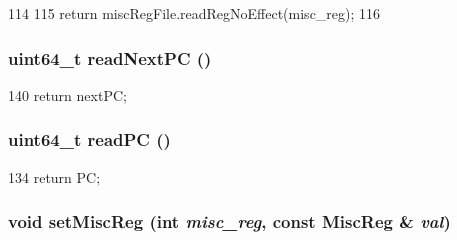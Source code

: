 \begin{DoxyCode}
114     {
115         return miscRegFile.readRegNoEffect(misc_reg);
116     }
\end{DoxyCode}
\hypertarget{structOzoneThreadState_acac7689eb460c7ab0e23797c198b7028}{
\subsubsection[{readNextPC}]{\setlength{\rightskip}{0pt plus 5cm}uint64\_\-t readNextPC ()}}
\label{structOzoneThreadState_acac7689eb460c7ab0e23797c198b7028}



\begin{DoxyCode}
140     { return nextPC; }
\end{DoxyCode}
\hypertarget{structOzoneThreadState_a30cb2afdfdc1383b7804c167dcf5ee78}{
\subsubsection[{readPC}]{\setlength{\rightskip}{0pt plus 5cm}uint64\_\-t readPC ()}}
\label{structOzoneThreadState_a30cb2afdfdc1383b7804c167dcf5ee78}



\begin{DoxyCode}
134     { return PC; }
\end{DoxyCode}
\hypertarget{structOzoneThreadState_a1877dde4f3eb17a8b7d33ea40176c148}{
\subsubsection[{setMiscReg}]{\setlength{\rightskip}{0pt plus 5cm}void setMiscReg (int {\em misc\_\-reg}, \/  const {\bf MiscReg} \& {\em val})}}
\label{structOzoneThreadState_a1877dde4f3eb17a8b7d33ea40176c148}



